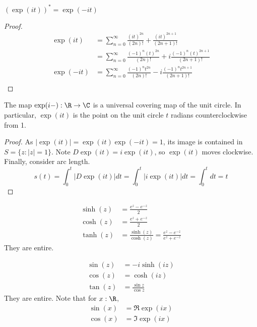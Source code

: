\documentclass[10pt]{scrartcl}
\begin{document}
\begin{lemma}
$\left(\exp(it)\right)^*=\exp(-it)$ 
\end{lemma}
\begin{proof}
  \begin{align*}
    \exp(it)&=\sum_{n=0}^\infty\frac{(it)^{2n}}{(2n)!} +\frac{(it)^{2n+1}}{(2n+1)!}\\
            &=\sum_{n=0}^\infty\frac{(-1)^n(t)^{2n}}{(2n)!} +i\frac{(-1)^n(t)^{2n+1}}{(2n+1)!}\\
    \exp(-it) &=\sum_{n=0}^\infty\frac{(-1)^nt^{2n}}{(2n)!} -i\frac{(-1)^nt^{2n+1}}{(2n+1)!}\\
\end{align*}
\end{proof}

\begin{theorem}
  The map $\exp(i-):\R\to\C$ is a universal covering map of the unit circle. In particular, $\exp(it)$ is the point on the unit circle $t$ radians counterclockwise from 1. 
\end{theorem}
\begin{proof}
  As $|\exp(it)|=\exp(it)\exp(-it)=1$, its image is contained in $S=\{z:|z|=1\}$.
  Note $D\exp(it)=i\exp(it)$, so $\exp(it)$ moves clockwise. 
  Finally, consider arc length.
  \[
  s(t)= \int_0^t |D\exp(it)|dt = \int_0^t |i\exp(it)|dt = \int_0^t dt = t
  \]
\end{proof}

\begin{example}
  \begin{align*}
    \sinh(z)&=\frac{e^z-e^{-z}}2\\
    \cosh(z)&=\frac{e^z+e^{-z}}2\\
    \tanh(z)&=\frac{\sinh(z)}{\cosh(z)}=\frac{e^z-e^{-z}}{e^z+e^{-z}}
  \end{align*}
  They are entire.
\end{example}

\begin{example}[trig]
  \begin{align*}
    \sin(z)&=-i\sinh(iz)\\
    \cos(z)&=\cosh(iz)\\
    \tan(z)&=\frac{\sin z}{\cos z}
  \end{align*}
  They are entire. 
  Note that for $x:\R$, 
  \begin{align*}
    \sin(x)&=\Re \exp(ix)\\
    \cos(x)&=\Im \exp(ix)
  \end{align*}
\end{example}
\end{document}
